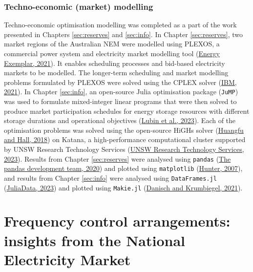 \documentclass[12pt,a4paper,]{report}
\begin{document}
\hypertarget{techno-economic-market-modelling}{%
\subsection{Techno-economic (market)
modelling}\label{techno-economic-market-modelling}}

Techno-economic optimisation modelling was completed as a part of the
work presented in Chapters \ref{sec:reserves} and \ref{sec:info}. In
Chapter \ref{sec:reserves}, two market regions of the Australian NEM
were modelled using PLEXOS, a commercial power system and electricity
market modelling tool
(\protect\hyperlink{ref-energyexemplarPLEXOSEnergyMarket2021}{Energy
Exemplar, 2021}). It enables scheduling processes and bid-based
electricity markets to be modelled. The longer-term scheduling and
market modelling problems formulated by PLEXOS were solved using the
CPLEX solver (\protect\hyperlink{ref-ibmCPLEXOptimizer2021}{IBM, 2021}).
In Chapter \ref{sec:info}, an open-source Julia optimisation package
(\texttt{JuMP}) was used to formulate mixed-integer linear programs that
were then solved to produce market participation schedules for energy
storage resources with different storage durations and operational
objectives
(\protect\hyperlink{ref-lubinJuMPRecentImprovements2023}{Lubin et al.,
2023}). Each of the optimisation problems was solved using the
open-source HiGHs solver
(\protect\hyperlink{ref-huangfuParallelizingDualRevised2018}{Huangfu and
Hall, 2018}) on Katana, a high-performance computational cluster
supported by UNSW Research Technology Services
(\protect\hyperlink{ref-unswresearchtechnologyservicesKatana2023}{UNSW
Research Technology Services, 2023}). Results from Chapter
\ref{sec:reserves} were analysed using \texttt{pandas}
(\protect\hyperlink{ref-reback2020pandas}{The pandas development team,
2020}) and plotted using \texttt{matplotlib}
(\protect\hyperlink{ref-hunterMatplotlib2DGraphics2007}{Hunter, 2007}),
and results from Chapter \ref{sec:info} were analysed using
\texttt{DataFrames.jl}
(\protect\hyperlink{ref-juliadataDataFramesJl2023}{JuliaData, 2023}) and
plotted using \texttt{Makie.jl}
(\protect\hyperlink{ref-danischMakieJlFlexible2021}{Danisch and
Krumbiegel, 2021}).

\hypertarget{sec:fcs}{%
\chapter{Frequency control arrangements: insights from the National
Electricity Market}\label{sec:fcs}}
\end{document}
